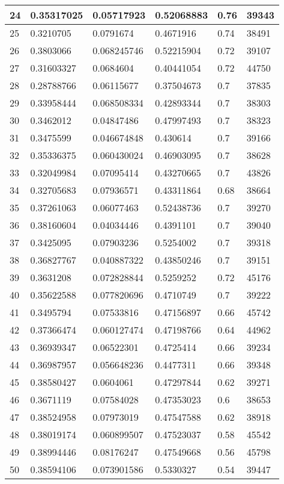 \begin{longtable}{|l|l|l|l|l|l|}
24 & 0.35317025 & 0.05717923 & 0.52068883 & 0.76 & 39343 \\ \hline 
25 & 0.3210705 & 0.0791674 & 0.4671916 & 0.74 & 38491 \\ \hline 
26 & 0.3803066 & 0.068245746 & 0.52215904 & 0.72 & 39107 \\ \hline 
27 & 0.31603327 & 0.0684604 & 0.40441054 & 0.72 & 44750 \\ \hline 
28 & 0.28788766 & 0.06115677 & 0.37504673 & 0.7 & 37835 \\ \hline 
29 & 0.33958444 & 0.068508334 & 0.42893344 & 0.7 & 38303 \\ \hline 
30 & 0.3462012 & 0.04847486 & 0.47997493 & 0.7 & 38323 \\ \hline 
31 & 0.3475599 & 0.046674848 & 0.430614 & 0.7 & 39166 \\ \hline 
32 & 0.35336375 & 0.060430024 & 0.46903095 & 0.7 & 38628 \\ \hline 
33 & 0.32049984 & 0.07095414 & 0.43270665 & 0.7 & 43826 \\ \hline 
34 & 0.32705683 & 0.07936571 & 0.43311864 & 0.68 & 38664 \\ \hline 
35 & 0.37261063 & 0.06077463 & 0.52438736 & 0.7 & 39270 \\ \hline 
36 & 0.38160604 & 0.04034446 & 0.4391101 & 0.7 & 39040 \\ \hline 
37 & 0.3425095 & 0.07903236 & 0.5254002 & 0.7 & 39318 \\ \hline 
38 & 0.36827767 & 0.040887322 & 0.43850246 & 0.7 & 39151 \\ \hline 
39 & 0.3631208 & 0.072828844 & 0.5259252 & 0.72 & 45176 \\ \hline 
40 & 0.35622588 & 0.077820696 & 0.4710749 & 0.7 & 39222 \\ \hline 
41 & 0.3495794 & 0.07533816 & 0.47156897 & 0.66 & 45742 \\ \hline 
42 & 0.37366474 & 0.060127474 & 0.47198766 & 0.64 & 44962 \\ \hline 
43 & 0.36939347 & 0.06522301 & 0.4725414 & 0.66 & 39234 \\ \hline 
44 & 0.36987957 & 0.056648236 & 0.4477311 & 0.66 & 39348 \\ \hline 
45 & 0.38580427 & 0.0604061 & 0.47297844 & 0.62 & 39271 \\ \hline 
46 & 0.3671119 & 0.07584028 & 0.47353023 & 0.6 & 38653 \\ \hline 
47 & 0.38524958 & 0.07973019 & 0.47547588 & 0.62 & 38918 \\ \hline 
48 & 0.38019174 & 0.060899507 & 0.47523037 & 0.58 & 45542 \\ \hline 
49 & 0.38994446 & 0.08176247 & 0.47549668 & 0.56 & 45798 \\ \hline 
50 & 0.38594106 & 0.073901586 & 0.5330327 & 0.54 & 39447 \\ \hline 
\end{longtable}